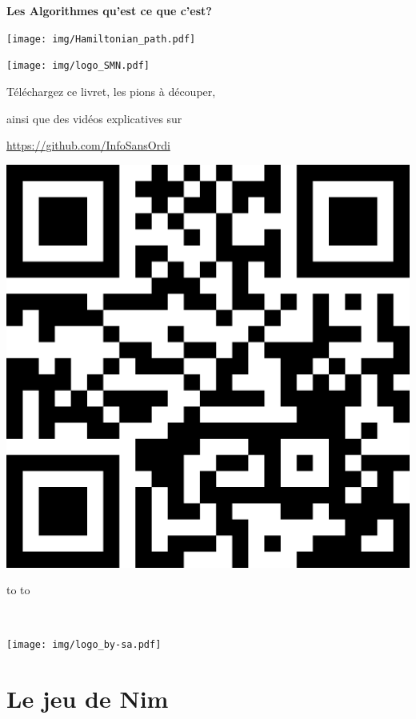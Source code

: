 \documentclass[a7paper,pagesize,DIV=14,10pt]{scrbook}
\begin{document}
%  
\begin{center}
  \textbf{{\huge Les Algorithmes} \Large qu'est ce que c'est? }
  
  \texttt{[image: img/Hamiltonian\_path.pdf]}

\medskip
\centerline{\texttt{[image: img/logo\_SMN.pdf]}}

\smallskip
\begin{spacing}{.8}
  \centerline{\footnotesize Téléchargez ce livret, les pions à découper,}
  \centerline{\footnotesize ainsi que des vidéos explicatives sur}

  \centerline{\small\color{blue}\url{https://github.com/InfoSansOrdi}}
\end{spacing}

\includegraphics[width=.25\linewidth]{img/QRcode-InfoSansOrdi} 
\end{center}

\vspace{-.3\baselineskip}
\begin{minipage}{.8\linewidth}
  \begin{spacing}{.5}
    \hbox to \linewidth{\tiny~\hfill Vous pouvez copier, modifier et diffuser librement ce document,}
    \hbox to \linewidth{\tiny~\hfill à la seule condition de laisser ces mêmes droits à vos lecteurs.}
  \end{spacing}
\end{minipage}%
~
\begin{minipage}[b]{.16\linewidth}
  \texttt{[image: img/logo\_by-sa.pdf]}
\end{minipage}%


\section*{Le jeu de Nim}
\end{document}
